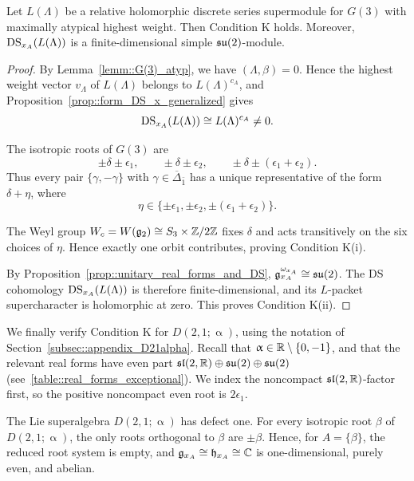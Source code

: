 \begin{proposition}
\label{prop::condition_K_G3}
Let $L(\Lambda)$ be a relative holomorphic discrete series supermodule for $G(3)$ with maximally atypical highest weight. Then Condition K holds. Moreover, $\operatorname{DS}_{x_A}(L(\Lambda))$ is a finite-dimensional simple ${\mathfrak{su}}(2)$-module.
\end{proposition}
\begin{proof}
By Lemma~\ref{lemm::G(3)_atyp}, we have $(\Lambda,\beta)=0$. Hence the highest weight vector $v_{\Lambda}$ of $L(\Lambda)$ belongs to $L(\Lambda)^{c_A}$, and Proposition~\ref{prop::form_DS_x_generalized} gives
\begin{equation*}
\operatorname{DS}_{x_A}(L(\Lambda))
\cong L(\Lambda)^{c_A}\neq0.
\end{equation*}

The isotropic roots of $G(3)$ are
\begin{equation*}
\pm\delta\pm\epsilon_1,\qquad
\pm\delta\pm\epsilon_2,\qquad
\pm\delta\pm(\epsilon_1+\epsilon_2).
\end{equation*}
Thus every pair $\{\gamma,-\gamma\}$ with $\gamma\in\overline{\Delta}_{\bar{1}}$ has a unique representative of the form $\delta+\eta$, where
\begin{equation*}
\eta\in
\{\pm\epsilon_1,\pm\epsilon_2,\pm(\epsilon_1+\epsilon_2)\}.
\end{equation*}

The Weyl group $W_c=W({\mathfrak{g}}_2)\cong S_3\times{\mathbb Z}/2{\mathbb Z}$ fixes $\delta$ and acts transitively on the six choices of $\eta$. Hence exactly one orbit contributes, proving Condition K(i).

By Proposition~\ref{prop::unitary_real_forms_and_DS}, ${\mathfrak{g}}_{x_A}^{\omega_{x_A}}\cong{\mathfrak{su}}(2)$. The DS cohomology $\operatorname{DS}_{x_A}(L(\Lambda))$ is therefore finite-dimensional, and its $L$-packet supercharacter is holomorphic at zero. This proves Condition K(ii).
\end{proof}


We finally verify Condition K for $D(2,1;\upalpha)$, using the notation of Section~\ref{subsec::appendix_D21alpha}. Recall that $\upalpha\in{\mathbb R}\setminus\{0,-1\}$, and that the relevant real forms have even part ${\mathfrak{sl}}(2,{\mathbb R})\oplus{\mathfrak{su}}(2)\oplus{\mathfrak{su}}(2)$ (see~\eqref{table::real_forms_exceptional}). We index the noncompact ${\mathfrak{sl}}(2,{\mathbb R})$-factor first, so the positive noncompact even root is $2\epsilon_1$.

The Lie superalgebra $D(2,1;\upalpha)$ has defect one. For every isotropic root $\beta$ of $D(2,1;\upalpha)$, the only roots orthogonal to $\beta$ are $\pm\beta$. Hence, for $A=\{\beta\}$, the reduced root system is empty, and
$
{\mathfrak{g}}_{x_A}\cong{\mathfrak h}_{x_A}\cong{\mathbb C}
$
is one-dimensional, purely even, and abelian.


